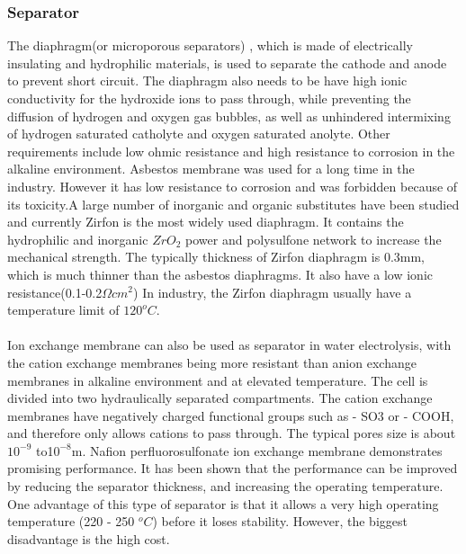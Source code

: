 \subsubsection{Separator} 
The diaphragm(or microporous separators) , which is made of electrically insulating and hydrophilic materials, is used to separate the cathode and anode to prevent short circuit. The diaphragm also needs to be have high ionic conductivity for the hydroxide ions to pass through, while preventing the diffusion of hydrogen and oxygen gas bubbles, as well as unhindered intermixing of hydrogen saturated catholyte and oxygen saturated anolyte. Other requirements include low ohmic resistance and high resistance to corrosion in the alkaline environment. Asbestos membrane was used for a long time in the industry. However it has low resistance to corrosion and was forbidden because of its toxicity.A large number of inorganic and organic substitutes have been studied and currently Zirfon is the most widely used diaphragm. It contains the hydrophilic and inorganic $ZrO_2$ power and polysulfone network to increase the mechanical strength. The typically thickness of Zirfon diaphragm is 0.3mm, which is much thinner than the asbestos diaphragms. It also have a low ionic resistance(0.1-0.2$\Omega cm^2$)\cite{zirfon} In industry, the Zirfon diaphragm usually have a temperature limit of $120^oC$.\cite{pressure}\\\\
Ion exchange membrane can also be used as separator in water electrolysis, with the cation exchange membranes being more resistant than anion exchange membranes in alkaline environment and at elevated temperature. The cell is divided into two hydraulically separated compartments. The cation exchange membranes have negatively charged functional groups such as - SO3 or - COOH, and therefore only allows cations to pass through. \cite{ionexchange} The typical pores size is about $10^{-9}$ to1$ 0^{-8}$m.\cite{separator} Nafion perfluorosulfonate ion exchange membrane demonstrates promising performance. It has been shown that the performance can be improved by reducing the separator thickness, and increasing the operating temperature. One advantage of this type of separator is that it allows a very high operating temperature (220 - 250 $^oC$)\cite{separator3} before it loses stability. However, the biggest disadvantage is the high cost.\cite{separator2} 

